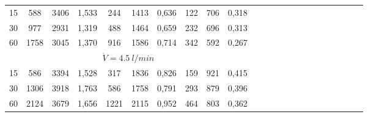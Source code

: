 \begin{table}[h!]
\begin{tabular}{c c c c c c c c c c c c c c c c c c c c c c c}
      \midrule
    15	&     588   & 3406 &  1,533  &     244  & 1413  &  0,636  &    122   & 706 &  0,318 \\
    30	&     977   & 2931 &  1,319  &     488  & 1464  &  0,659  &    232   & 696 &  0,313 \\
    60	&     1758  & 3045 &  1,370  &     916  & 1586  &  0,714  &    342   & 592 &  0,267 \\
      \midrule
      \multicolumn{10}{c}{$\dot{V}=\SI{4,5}{l/min}$}\\
      \midrule
    15	&     586   & 3394 &  1,528  &     317  & 1836  &  0,826  &    159   & 921 &  0,415 \\
    30	&     1306  & 3918 &  1,763  &     586  & 1758  &  0,791  &    293   & 879 &  0,396 \\
    60	&     2124  & 3679 &  1,656  &     1221 & 2115  &  0,952  &    464   & 803 &  0,362 \\

    \bottomrule
  \end{tabular}
\end{table}


